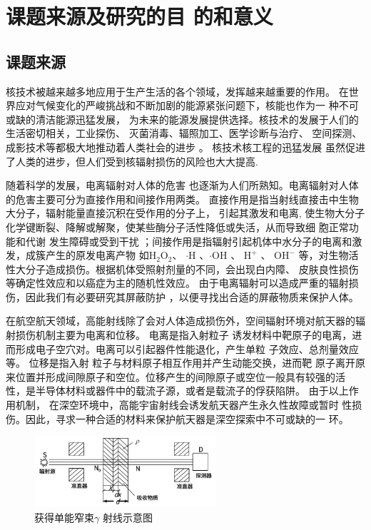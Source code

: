 \section{课题来源及研究的目	的和意义}
\subsection{课题来源}
核技术被越来越多地应用于生产生活的各个领域，发挥越来越重要的作用。
在世界应对气候变化的严峻挑战和不断加剧的能源紧张问题下，核能也作为一
种不可或缺的清洁能源迅猛发展，
为未来的能源发展提供选择。核技术的发展于人们的生活密切相关，工业探伤、
灭菌消毒、辐照加工、医学诊断与治疗、
空间探测、成影技术等都极大地推动着人类社会的进步
\cite{2002原子核物理}。
核技术核工程的迅猛发展
虽然促进了人类的进步，但人们受到核辐射损伤的风险也大大提高.
  
随着科学的发展，电离辐射对人体的危害
也逐渐为人们所熟知。电离辐射对人体的危害主要可分为直接作用和间接作用两类。
直接作用是指当射线直接击中生物大分子，辐射能量直接沉积在受作用的分子上，
引起其激发和电离,
使生物大分子化学键断裂、降解或解聚，使某些酶分子活性降低或失活，从而导致细
胞正常功能和代谢
发生障碍或受到干扰
；间接作用是指辐射引起机体中水分子的电离和激发，成簇产生的原发电离产物
如$ \mathrm{H_2O_2} $、 $ \cdot \mathrm{H} $ 、$ \cdot \mathrm{OH} $ 、
$ \mathrm{H}^+ $ 、 $ \mathrm{OH}^- $  
等，对生物活性大分子造成损伤。根据机体受照射剂量的不同，会出现白内障、
皮肤良性损伤等确定性效应和以癌症为主的随机性效应。
由于电离辐射可以造成严重的辐射损伤，因此我们有必要研究其屏蔽防护
，以便寻找出合适的屏蔽物质来保护人体。
\cite{霍雷2015辐射剂量与防护}


在航空航天领域，高能射线除了会对人体造成损伤外，空间辐射环境对航天器的辐
射损伤机制主要为电离和位移。 电离是指入射粒子
诱发材料中靶原子的电离，进而形成电子空穴对。电离可以引起器件性能退化，产生单粒
子效应、总剂量效应等\cite{slayman2011jedec,8892478}。 位移是指入射
粒子与材料原子相互作用并产生动能交换，进而靶
原子离开原来位置并形成间隙原子和空位。位移产生的间隙原子或空位一般具有较强的活
性，是半导体材料或器件中的载流子源，或者是载流子的俘获陷阱。 由于以上作用机制，
在深空环境中，高能宇宙射线会诱发航天器产生永久性故障或暂时
性损伤。因此，寻求一种合适的材料来保护航天器是深空探索中不可或缺的一
环\cite{沈自才2020航天器空间辐射防护材料与防护结构}。
\begin{figure}[h]
    \centering
    \includegraphics[width = 0.6\textwidth]{图片1.png}
    \caption{获得单能窄束$ \gamma $ 射线示意图}
    \end{figure}
    
